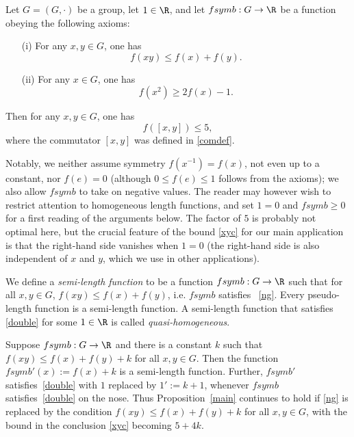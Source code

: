 \begin{proposition}\label{main}
	Let $G = (G,\cdot)$ be a group, let { $1 \in \R$}, and let
	$fsymb: G \to \R$ be a function obeying the following axioms:
	\begin{itemize}
		\item[(i)]  For any $x,y \in G$, one has
		      \begin{equation}\label{ng}
		      	f(xy) \leq f(x)+f(y).
		      \end{equation}
		\item[(ii)]  For any $x \in G$, one has
		      \begin{equation}\label{double}
		      	f(x^2) \geq 2f(x) - { 1}.
		      \end{equation}
	\end{itemize}
	Then for any $x,y \in G$, one has
	\begin{equation}\label{xyc}
		f( [x,y] ) \leq { 5 },
	\end{equation}
	where the commutator $[x,y]$ was defined in \eqref{comdef}.

Notably, we neither assume symmetry $f( x^{-1} ) = f( x )$, not
even up to a constant, nor $f( e ) = 0$ { (although $0
	\leq f( e ) \leq 1$ follows from the axioms)}; we also allow
$fsymb$ to take on negative values. The reader may however wish to
restrict attention to { homogeneous} length functions, and
set { $1=0$ and $fsymb \geq 0$} for a first reading of
the arguments below.  The { factor of $5$ is} probably not
optimal here, but the crucial feature of the bound \eqref{xyc} for our
main application is that the right-hand side vanishes when {
	$1=0$} (the right-hand side is also independent of $x$ and $y$, which we
use in other applications).

{ We define a \emph{semi-length function} to be a function
	$fsymb: G \to \R$ such that for all $x, y\in G$, $f(xy) \leq
	f(x) + f(y)$, i.e.  $fsymb$ satisfies ~\eqref{ng}. Every
	pseudo-length function is a semi-length function. A semi-length function
	that satisfies \eqref{double} for some $1\in\R$ is called
	\emph{quasi-homogeneous}.
	
	\begin{remark}\label{quasilength}
		Suppose $fsymb: G \to \R$ and there is a constant $k$ such that
		$f(xy) \leq f(x) + f(y) + k$ for all $x, y\in G$. Then the
		function $fsymb'(x) := f(x) + k$ is a semi-length {
		function}. Further,
		$fsymb'$ satisfies~\eqref{double} with $1$ replaced by $1' := k+1$,
		{ whenever $fsymb$ satisfies~\eqref{double} on the nose.}
		Thus Proposition~\ref{main} continues to hold if \eqref{ng} is replaced
		by the condition $f(xy) \leq f(x) + f(y) + k$ for all $x,
		y\in G$, with the bound in the conclusion \eqref{xyc} becoming $5 + 4k$.
	\end{remark}
}


\end{proposition}
